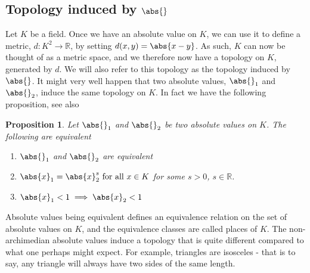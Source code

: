 \documentclass{article}
\newtheorem{proposition}{Proposition}[section]
\newcommand{\mbb}[1]{\mathbb{#1}}
\numberwithin{equation}{section}
\begin{document}


\subsection{Topology induced by $\abs{}$}
Let $K$ be a field. Once we have an absolute value on $K$, we can use it to define a metric, $d : K^2 \to \mbb R$, by setting $d(x,y) = \abs{x - y}$. As such, $K$ can now be thought of as a metric space, and we therefore now have a topology on $K$, generated by $d$. We will also refer to this topology as the topology induced by $\abs{}$. It might very well happen that two absolute values, $\abs{}_1$ and $\abs{}_2$, induce the same topology on $K$. In fact we have the following proposition, see also \citep[Proposition 3.3]{neukirch}
\begin{proposition}\label{Equivalent absolute values}
    Let $\abs{}_1$ and $\abs{}_2$ be two absolute values on $K$. The following are equivalent
    \begin{enumerate}
        \item $\abs{}_1$ and $\abs{}_2$ are equivalent
        \item $\abs{x}_1 = \abs{x}_2^s \text{ for all } x\in K$ for some $s > 0$, $s \in \mbb R$.
        \item $\abs{x}_1 < 1 \implies \abs{x}_2 < 1$
    \end{enumerate}
\end{proposition}



Absolute values being equivalent defines an equivalence relation on the set of absolute values on $K$, and the equivalence classes are called places of $K$. The non-archimedian absolute values induce a topology that is quite different compared to what one perhaps might expect. For example, triangles are isosceles - that is to say, any triangle will always have two sides of the same length.
\end{document}
